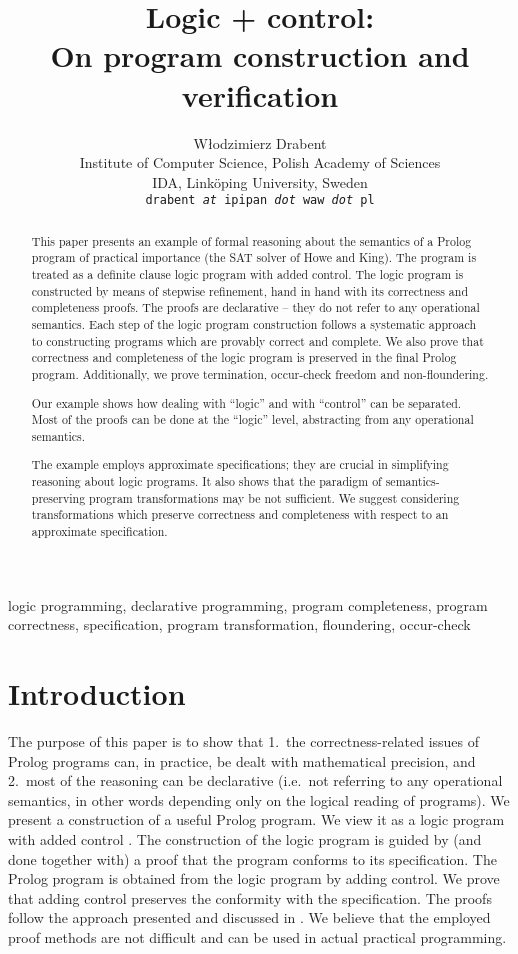 \documentclass{tlp}
\title[Logic + control]
{Logic + control:  \\ 
  On program construction and  verification}
\author[W. Drabent]
    {
W{\l}odzimierz Drabent\\        
         Institute of Computer Science,
         Polish Academy of Sciences
\\
IDA, Link\"oping University, Sweden \\
         {\tt drabent\,{\it at}\/\,ipipan\,{\it dot}\/\,waw\,{\it dot}\/\,pl}
}
\begin{document}
\maketitle


\begin{abstract}
This paper presents an example of formal reasoning about the semantics of a
Prolog program of practical importance (the SAT solver of Howe and King).
The program is treated as a definite clause logic program with added control.
The logic program is constructed by means of stepwise refinement, hand in
hand with its correctness and completeness proofs.
The proofs are declarative -- they do not refer to any
operational semantics. 
Each step of the logic program construction follows a systematic approach to
constructing programs which are provably correct and complete.
We also prove that correctness and completeness of the logic
program is preserved in the final Prolog program.
Additionally, we prove termination, occur-check freedom and non-floundering.


Our example shows how dealing with ``logic'' and with ``control'' 
can be separated. 
Most of the proofs
can be done at the ``logic'' level, abstracting from any operational semantics.

The example employs approximate specifications; they are crucial in
simplifying reasoning about logic programs.
It also shows that the paradigm of semantics-preserving program
transformations may be not sufficient.  
We suggest considering transformations which preserve correctness and
completeness with respect to an approximate specification.

\end{abstract}
\begin{keywords}
logic programming,
declarative programming,
program completeness,
program correctness,
specification,
program transformation,
floundering,
occur-check

\end{keywords}


\section{Introduction}

The purpose of this paper is to show that 1.~the correctness-related
issues of Prolog programs can, in practice, be dealt with mathematical
precision, 
and 2.~most of the reasoning can be declarative
(i.e.\ not referring to any operational semantics,
in other words depending only on the logical reading of programs).
We present a construction of a useful Prolog program.
We view it as a logic program with added control
\cite{DBLP:journals/cacm/Kowalski79}. 
The construction of the logic program is guided by
(and done together with)
a proof that the program conforms to its specification.
The Prolog program is obtained from the logic program by adding control.
We prove that adding control preserves the conformity with the specification.
The proofs follow the approach presented and discussed in
\cite{drabent.tocl16}. 
   We believe that the employed proof methods are not difficult and can be used
in actual practical programming.
\end{document}
